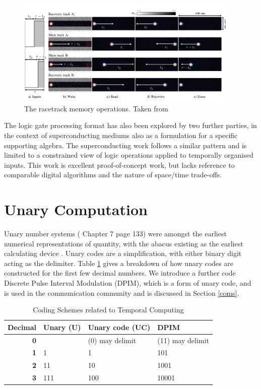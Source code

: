 \documentclass{article}
\begin{document}
\begin{figure}[ht]
	\centering
	\includegraphics[width=300pt]{figures/racetrack.png}
	\caption{The racetrack memory operations. Taken from \cite{vakili2020temporal}}
	\label{fig:racetrack}
\end{figure}

The logic gate processing format has also been explored by two further parties, in the context of superconducting mediums \cite{tzimpragos2019arbitrary} \cite{tzimpragos2021temporal} \cite{tzimpragos2022computing} \cite{volk2023addressable} \cite{segal2022digital} also as a formulation for a specific supporting algebra. The superconducting work follows a similar pattern and is limited to a constrained view of logic operations applied to temporally organised inputs. This work is excellent proof-of-concept work, but lacks reference to comparable digital algorithms and the nature of space/time trade-offs.

\section{Unary Computation} \label{unary}

Unary number systems (\cite{MacKay:2002:ITI:971143} Chapter 7 page 133) were amongst the earliest numerical representations of quantity, with the abacus existing as the earliest calculating device \cite{POPPELBAUM198747}. Unary codes are a simplification, with either binary digit acting as the delimiter. Table \ref{mem1} gives a breakdown of how unary codes are constructed for the first few decimal numbers. We introduce a further code Discrete Pulse Interval Modulation (DPIM), which is a form of unary code, and is used in the communication community and is discussed in Section \ref{coms}.

\begin{table}[ht]
	\begin{center}
		\begin{tabular}{rlll} \hline
			\textbf{Decimal} & Unary (U) & Unary code (UC) & DPIM             \\\hline
			\textbf{0}       &           & (0) may delimit & (11) may delimit \\
			\textbf{1}       & 1         & 1               & 101              \\
			\textbf{2}       & 11        & 10              & 1001             \\
			\textbf{3}       & 111       & 100             & 10001            \\ \hline
		\end{tabular}
	\end{center}
	\caption{Coding Schemes related to Temporal Computing}\label{mem1}
\end{table}
\end{document}
